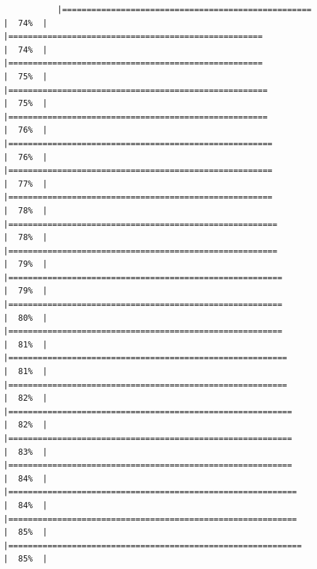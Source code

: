 \documentclass[
]{article}
\begin{document}
\begin{verbatim}
           |===================================================                   |  74%  |                                                                              |====================================================                  |  74%  |                                                                              |====================================================                  |  75%  |                                                                              |=====================================================                 |  75%  |                                                                              |=====================================================                 |  76%  |                                                                              |======================================================                |  76%  |                                                                              |======================================================                |  77%  |                                                                              |======================================================                |  78%  |                                                                              |=======================================================               |  78%  |                                                                              |=======================================================               |  79%  |                                                                              |========================================================              |  79%  |                                                                              |========================================================              |  80%  |                                                                              |========================================================              |  81%  |                                                                              |=========================================================             |  81%  |                                                                              |=========================================================             |  82%  |                                                                              |==========================================================            |  82%  |                                                                              |==========================================================            |  83%  |                                                                              |==========================================================            |  84%  |                                                                              |===========================================================           |  84%  |                                                                              |===========================================================           |  85%  |                                                                              |============================================================          |  85%  |                                                                    
\end{verbatim}
\end{document}
